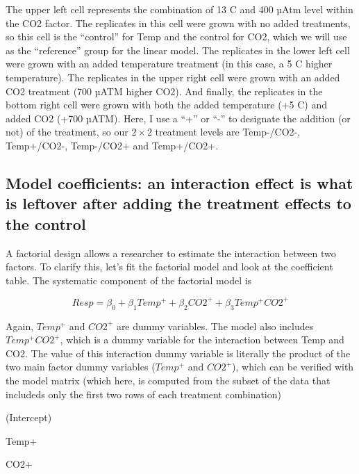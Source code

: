 \documentclass[]{book}
\begin{document}
The upper left cell represents the combination of 13 C and 400 µAtm level within the CO2 factor. The replicates in this cell were grown with no added treatments, so this cell is the ``control'' for Temp and the control for CO2, which we will use as the ``reference'' group for the linear model. The replicates in the lower left cell were grown with an added temperature treatment (in this case, a 5 C higher temperature). The replicates in the upper right cell were grown with an added CO2 treatment (700 µATM higher CO2). And finally, the replicates in the bottom right cell were grown with both the added temperature (+5 C) and added CO2 (+700 µATM). Here, I use a ``+'' or ``-'' to designate the addition (or not) of the treatment, so our \(2 \times 2\) treatment levels are Temp-/CO2-, Temp+/CO2-, Temp-/CO2+ and Temp+/CO2+.

\hypertarget{model-coefficients-an-interaction-effect-is-what-is-leftover-after-adding-the-treatment-effects-to-the-control}{%
\subsection{Model coefficients: an interaction effect is what is leftover after adding the treatment effects to the control}\label{model-coefficients-an-interaction-effect-is-what-is-leftover-after-adding-the-treatment-effects-to-the-control}}

A factorial design allows a researcher to estimate the interaction between two factors. To clarify this, let's fit the factorial model and look at the coefficient table. The systematic component of the factorial model is

\begin{equation}
Resp = \beta_0 + \beta_1 Temp^+ + \beta_2 CO2^+ + \beta_3 Temp^+ CO2^+
\label{eq:factorial-full}
\end{equation}

Again, \(Temp^+\) and \(CO2^+\) are dummy variables. The model also includes \(Temp^+ CO2^+\), which is a dummy variable for the interaction between Temp and CO2. The value of this interaction dummy variable is literally the product of the two main factor dummy variables (\(Temp^+\) and \(CO2^+\)), which can be verified with the model matrix (which here, is computed from the subset of the data that includeds only the first two rows of each treatment combination)

(Intercept)

Temp+

CO2+
\end{document}
